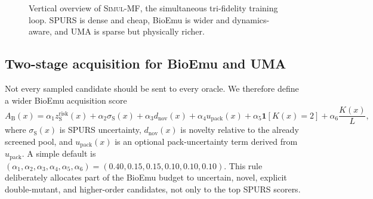 \documentclass[11pt]{article}
\newcommand{\SubTB}{\ensuremath{\mathrm{SubTB}}}
\newcommand{\packunc}{\ensuremath{u_{\mathrm{pack}}}}
\newcommand{\methodI}{\textsc{Simul-MF}}
\begin{document}
\begin{figure}[p]
\caption{Vertical overview of \methodI{}, the simultaneous tri-fidelity training loop. SPURS is dense and cheap, BioEmu is wider and dynamics-aware, and UMA is sparse but physically richer.}
\label{fig:simultaneous}
\end{figure}


\subsection{Two-stage acquisition for BioEmu and UMA}

Not every sampled candidate should be sent to every oracle. We therefore define a wider BioEmu acquisition score
\begin{equation}
\label{eq:acqbioemu}
    A_{\mathrm B}(x)=\alpha_1 z_{\mathrm S}^{\mathrm{risk}}(x)+\alpha_2 \sigma_{\mathrm S}(x)+\alpha_3 d_{\mathrm{nov}}(x)+\alpha_4 u_{\mathrm{pack}}(x)+\alpha_5 \mathbf{1}[K(x)=2]+\alpha_6 \frac{K(x)}{L},
\end{equation}
where $\sigma_{\mathrm S}(x)$ is SPURS uncertainty, $d_{\mathrm{nov}}(x)$ is novelty relative to the already screened pool, and $u_{\mathrm{pack}}(x)$ is an optional pack-uncertainty term derived from \packunc. A simple default is $(\alpha_1,\alpha_2,\alpha_3,\alpha_4,\alpha_5,\alpha_6)=(0.40,0.15,0.15,0.10,0.10,0.10)$. This rule deliberately allocates part of the BioEmu budget to uncertain, novel, explicit double-mutant, and higher-order candidates, not only to the top SPURS scorers.
\end{document}

